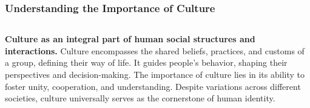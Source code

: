\documentclass[5pt]{beamer}
\begin{document}
\begin{frame}
\frametitle{Understanding the Importance of Culture}
\begin{columns}
\begin{column}{0.7\textwidth}
\begin{block}{\textbf{Culture as an integral part of human social structures and interactions.}}
Culture encompasses the shared beliefs, practices, and customs of a group, defining their way of life. It guides people's behavior, shaping their perspectives and decision-making. The importance of culture lies in its ability to foster unity, cooperation, and understanding. Despite variations across different societies, culture universally serves as the cornerstone of human identity.
\end{block}
\end{column}
\end{columns}
\end{frame}
\end{document}

